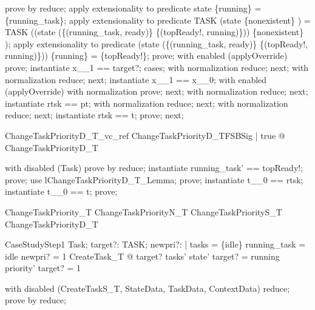 \documentclass[a4paper, 12pt]{article}
\begin{document}
\begin{zproof}
prove by reduce;
apply extensionality to predicate state \inv  \limg  \{running\} \rimg  = \{running\_task\};
apply extensionality to predicate TASK \setminus  (state \inv  \limg  \{nonexistent\} \rimg ) = TASK \setminus  ((state \oplus  (\{(running\_task, ready)\} \cup  \{(topReady!, running)\})) \inv  \limg  \{nonexistent\} \rimg );
apply extensionality to predicate (state \oplus  (\{(running\_task, ready)\} \cup  \{(topReady!, running)\})) \inv  \limg  \{running\} \rimg  = \{topReady!\};
prove;
with enabled (applyOverride) prove;
instantiate x\_\_1 == target?;
cases;
with normalization reduce;
next;
with normalization reduce;
next;
instantiate x\_\_1 == x\_\_0;
with enabled (applyOverride) with normalization prove;
next;
with normalization reduce;
next;
instantiate rtsk == pt;
with normalization reduce;
next;
with normalization reduce;
next;
instantiate rtsk == t;
prove;
next;
\end{zproof}

\begin{theorem}{ChangeTaskPriorityD\_T\_vc\_ref}
\forall  ChangeTaskPriorityD\_TFSBSig | true @ \pre  ChangeTaskPriorityD\_T
\end{theorem}

\begin{zproof}
with disabled (Task) prove by reduce;
instantiate running\_task' == topReady!;
prove;
use lChangeTaskPriorityD\_T\_Lemma;
prove;
instantiate t\_\_0 == rtsk;
instantiate t\_\_0 == t;
prove;
\end{zproof}

\begin{zed}
ChangeTaskPriority\_T  ChangeTaskPriorityN\_T
                       \lor ChangeTaskPriorityS\_T
                       \lor ChangeTaskPriorityD\_T
\end{zed}

\begin{theorem}{CaseStudyStep1}
\forall  Task; target?: TASK; newpri?: \nat  | tasks = \{idle\} \land  running\_task = idle \land  newpri? = 1 \land  CreateTask\_T @ target? \in  tasks' \land  state' target? = running \land  priority' target? = 1
\end{theorem}

\begin{zproof}[CaseStudyStep1]
with disabled (CreateTaskS\_T, StateData, TaskData, ContextData) reduce;
prove by reduce;
\end{zproof}
\end{document}
